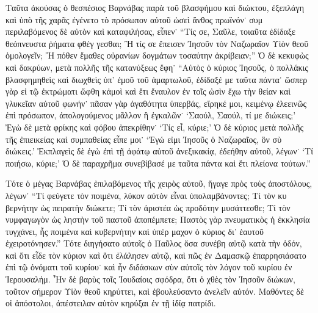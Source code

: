 Ταῦτα ἀκούσας ὁ θεσπέσιος Βαρνάβας παρὰ τοῦ
βλασφήμου καὶ διώκτου, ἐξεπλάγη καὶ ὑπὸ τῆς χαρᾶς
ἐγένετο τὸ πρόσωπον αὐτοῦ ὡσεὶ ἄνθος πρωϊνόν˙ συμ%
περιλαβόμενος δὲ αὐτὸν καὶ καταφιλήσας, εἶπεν˙ \enquote{Τίς
σε, Σαῦλε, τοιαῦτα ἐδίδαξε θεόπνευστα ῥήματα φθέγ%
γεσθαι; Ἢ τίς σε ἔπεισεν Ἰησοῦν τὸν Ναζωραῖον Υἱὸν
θεοῦ ὁμολογεῖν; Ἢ πόθεν ἔμαθες οὐρανίων δογμάτων
τοσαύτην ἀκρίβειαν;} Ὁ δὲ κεκυφὼς καὶ δακρύων, μετὰ
πολλῆς τῆς κατανύξεως ἔφη˙ \enquote{Αὐτὸς ὁ κύριος Ἰησοῦς,
ὁ πολλάκις βλασφημηθεὶς καὶ διωχθεὶς ὑπ’ ἐμοῦ τοῦ
ἁμαρτωλοῦ, ἐδίδαξέ με ταῦτα πάντα˙ ὥσπερ γὰρ εἰ
τῷ ἐκτρώματι ὤφθη κἀμοὶ καὶ ἔτι ἔναυλον ἐν τοῖς ὠσὶν
ἔχω τὴν θείαν καὶ γλυκεῖαν αὐτοῦ φωνήν˙ πᾶσαν γὰρ
ἀγαθότητα ὑπερβάς, εἴρηκέ μοι, κειμένῳ ἐλεεινῶς ἐπὶ
πρόσωπον, ἀπολογούμενος μᾶλλον ἢ ἐγκαλῶν˙ \enquote{Σαούλ,
Σαούλ, τί με διώκεις;} Ἐγὼ δὲ μετὰ φρίκης καὶ φόβου
ἀπεκρίθην˙ \enquote{Τίς εἶ, κύριε;} Ὁ δὲ κύριος μετὰ πολλῆς
τῆς ἐπιεικείας καὶ συμπαθείας εἶπε μοι˙ \enquote{Ἐγώ εἰμι Ἰησοῦς
ὁ Ναζωραῖος, ὃν σὺ διώκεις.} Ἐκπλαγεὶς δὲ ἐγὼ ἐπὶ
τῇ ἀφάτῳ αὐτοῦ ἀνεξικακίᾳ, ἐδεήθην αὐτοῦ, λέγων˙ \enquote{Τί
ποιήσω, κύριε;} Ὁ δὲ παραχρῆμα συνεβίβασέ με ταῦτα
πάντα καὶ ἔτι πλείονα τούτων.}

Τότε ὁ μέγας Βαρνάβας ἐπιλαβόμενος τῆς χειρὸς αὐτοῦ,
ἤγαγε πρὸς τοὺς ἀποστόλους, λέγων˙ \enquote{Τί φεύγετε τὸν
ποιμένα, λύκον αὐτὸν εἶναι ὑπολαμβάνοντες; Τί τὸν κυ%
βερνήτην ὡς πειρατὴν διώκετε; Τί τὸν ἀριστέα ὡς
προδότην μυσάττεσθε; Τί τὸν νυμφαγωγὸν ὡς ληστὴν
τοῦ παστοῦ ἀποπέμπετε; Παστὸς γὰρ πνευματικὸς ἡ
ἐκκλησία τυγχάνει, ἧς ποιμένα καὶ κυβερνήτην καὶ ὑπέρ%
μαχον ὁ κύριος δι’ ἑαυτοῦ ἐχειροτόνησεν.} Τότε διηγήσατο
αὐτοῖς ὁ Παῦλος ὅσα συνέβη αὐτῷ κατὰ τὴν ὁδόν, καὶ
ὅτι εἶδε τὸν κύριον καὶ ὅτι ἐλάλησεν αὐτῷ, καὶ πῶς
ἐν Δαμασκῷ ἐπαρρησιάσατο ἐπὶ τῷ ὀνόματι τοῦ κυρίου˙
καὶ ἦν διδάσκων σὺν αὐτοῖς τὸν λόγον τοῦ κυρίου ἐν
Ἱερουσαλήμ. Ἦν δὲ βαρὺς τοῖς Ἰουδαίοις σφόδρα, ὅτι
ὁ χθὲς τὸν Ἰησοῦν διώκων, τοῦτον σήμερον Υἱὸν θεοῦ
κηρύττει, καὶ ἐβουλεύσαντο ἀνελεῖν αὐτόν. Μαθόντες δὲ
οἱ ἀπόστολοι, ἀπέστειλαν αὐτὸν κηρύξαι ἐν τῇ ἰδίᾳ
πατρίδι.








